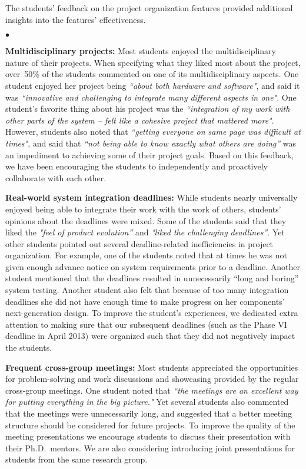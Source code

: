 \documentclass[journal,twopages]{IEEEtran}
\newcommand{\makered}[1]{\color{black}#1\color{black}}
\newenvironment{myitemize}{\begin{list}{$\bullet$}{\renewcommand{\leftmargin}{0.2in}}}{\end{list}}
\begin{document}
The students' feedback on the project organization features provided additional insights into the features' effectiveness.
\begin{myitemize}
\item  \textbf{Multidisciplinary projects:} Most students enjoyed the multidisciplinary nature of their projects. When specifying what they liked most about the project, over~50\% of the students commented on one of its multidisciplinary aspects. One student enjoyed her project being \emph{``about both hardware and software"}, and said it was \emph{``innovative and challenging to integrate many different aspects in one"}. One student's favorite thing about his project was the \emph{``integration of my work with other parts of the system -- felt like a cohesive project that mattered more"}. However, students also noted that \emph{``getting everyone on same page was difficult at times"}, and said that \emph{``not being able to know exactly what others are doing''} was an impediment to achieving some of their project goals. Based on this feedback, we have been encouraging the students to independently and proactively collaborate with each other.

\item  \textbf{Real-world system integration deadlines:}
    \makered{While students nearly universally enjoyed being able to integrate their work with the work of others, students' opinions about the deadlines were mixed.
    Some of the students said that they liked the \emph{"feel of product evolution''} and \emph{"liked the challenging deadlines''}. Yet other students pointed out several deadline-related inefficiencies in project organization. For example, one of the students noted that at times he was not given enough advance notice on system requirements prior to a deadline. Another student mentioned that the deadlines resulted in unnecessarily ``long and boring'' system testing. Another student also felt that because of too many integration deadlines she did not have enough time to make progress on her components' next-generation design.
    To improve the student's experiences, we dedicated extra attention to making sure that our subsequent deadlines (such as the Phase VI deadline in April 2013)
    were organized such that they did not negatively impact the students.} 

\item  \textbf{Frequent cross-group meetings:} Most students appreciated the opportunities for problem-solving and work discussions and showcasing provided by the regular cross-group meetings. One student noted that \emph{``the meetings are an excellent way for putting everything in the big picture."} Yet several students also commented that the meetings were unnecessarily long, and suggested that a better meeting structure should be considered for future projects. To improve the quality of the meeting presentations we encourage students to discuss their presentation with their Ph.D.\ mentors. We are also considering introducing joint presentations for students from the same research group.


\end{myitemize}
\end{document}
